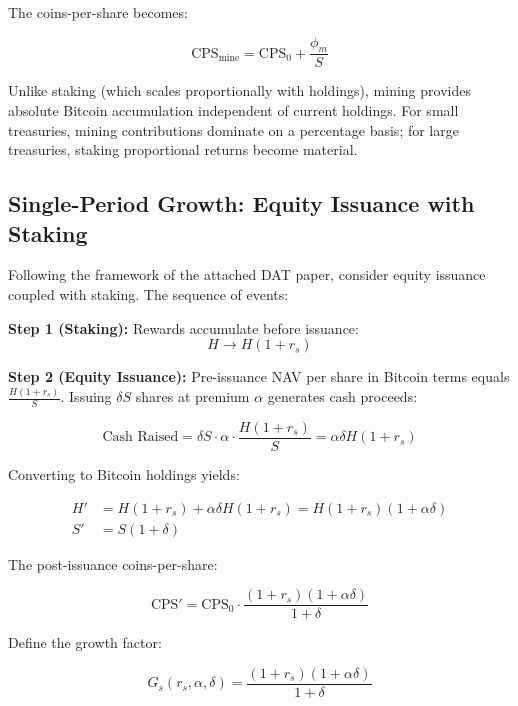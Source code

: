 \documentclass[
  journal=medium,
  manuscript=article-type,
  year=2025,
  volume=1,
]{cup-journal}
\theoremstyle{definition}
\begin{document}
The coins-per-share becomes:

\begin{equation}
\text{CPS}_{\text{mine}} = \text{CPS}_0 + \frac{\phi_m}{S}
\end{equation}

Unlike staking (which scales proportionally with holdings), mining provides absolute Bitcoin accumulation independent of current holdings. For small treasuries, mining contributions dominate on a percentage basis; for large treasuries, staking proportional returns become material.

\subsection{Single-Period Growth: Equity Issuance with Staking}

Following the framework of the attached DAT paper, consider equity issuance coupled with staking. The sequence of events:

\textbf{Step 1 (Staking):} Rewards accumulate before issuance:
\begin{equation}
H \to H(1 + r_s)
\end{equation}

\textbf{Step 2 (Equity Issuance):} Pre-issuance NAV per share in Bitcoin terms equals $\frac{H(1+r_s)}{S}$. Issuing $\delta S$ shares at premium $\alpha$ generates cash proceeds:

\begin{equation}
\text{Cash Raised} = \delta S \cdot \alpha \cdot \frac{H(1 + r_s)}{S} = \alpha \delta H(1 + r_s)
\end{equation}

Converting to Bitcoin holdings yields:

\begin{align}
H' &= H(1 + r_s) + \alpha \delta H(1 + r_s) = H(1 + r_s)(1 + \alpha\delta) \\
S' &= S(1 + \delta)
\end{align}

The post-issuance coins-per-share:

\begin{equation}
\text{CPS}' = \text{CPS}_0 \cdot \frac{(1 + r_s)(1 + \alpha\delta)}{1 + \delta}
\end{equation}

Define the growth factor:

\begin{equation}
G_s(r_s, \alpha, \delta) = \frac{(1 + r_s)(1 + \alpha\delta)}{1 + \delta}
\end{equation}
\end{document}
